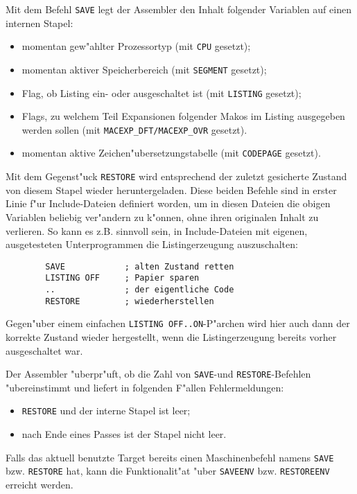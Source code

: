 \documentclass[12pt,a4paper,twoside]{report}
\newcommand{\tty}[1]{{\tt #1}}
\begin{document}
Mit dem Befehl \tty{SAVE} legt der Assembler den Inhalt folgender
Variablen auf einen internen Stapel:
\begin{itemize}
\item{momentan gew"ahlter Prozessortyp (mit \tty{CPU} gesetzt);}
\item{momentan aktiver Speicherbereich (mit \tty{SEGMENT} gesetzt);}
\item{Flag, ob Listing ein- oder ausgeschaltet ist (mit \tty{LISTING}
      gesetzt);}
\item{Flags, zu welchem Teil Expansionen folgender Makos im Listing
      ausgegeben werden sollen (mit \tty{MACEXP\_DFT/MACEXP\_OVR}
      gesetzt).}
\item{momentan aktive Zeichen"ubersetzungstabelle (mit \tty{CODEPAGE}
      gesetzt).}
\end{itemize}
Mit dem Gegenst"uck \tty{RESTORE} wird entsprechend der zuletzt
gesicherte Zustand von diesem Stapel wieder heruntergeladen.  Diese beiden
Befehle sind in erster Linie f"ur Include-Dateien definiert worden, um
in diesen Dateien die obigen Variablen beliebig ver"andern zu k"onnen,
ohne ihren originalen Inhalt zu verlieren.  So kann es z.B. sinnvoll sein,
in Include-Dateien mit eigenen, ausgetesteten Unterprogrammen die
Listingerzeugung auszuschalten:
\begin{verbatim}
        SAVE            ; alten Zustand retten
        LISTING OFF     ; Papier sparen
        ..              ; der eigentliche Code
        RESTORE         ; wiederherstellen
\end{verbatim}
Gegen"uber einem einfachen \tty{LISTING OFF..ON}-P"archen wird hier
auch dann der korrekte Zustand wieder hergestellt, wenn die Listingerzeugung
bereits vorher ausgeschaltet war.
\par
Der Assembler "uberpr"uft, ob die Zahl von \tty{SAVE}-und \tty{RESTORE}-Befehlen
"ubereinstimmt und liefert in folgenden F"allen Fehlermeldungen:
\begin{itemize}
\item{\tty{RESTORE} und der interne Stapel ist leer;}
\item{nach Ende eines Passes ist der Stapel nicht leer.}
\end{itemize}
Falls das aktuell benutzte Target bereits einen Maschinenbefehl namens \tty{SAVE}
bzw. \tty{RESTORE} hat, kann die Funktionalit"at "uber \tty{SAVEENV} bzw.
\tty{RESTOREENV} erreicht werden.

\end{document}
